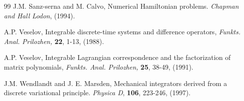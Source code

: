 \documentclass[a4paper,a4paper]{article}
\begin{document}
\begin{thebibliography} {99}
\label{s1}
J.M. Sanz-serna and M. Calvo, Numerical Hamiltonian problems. {\em
Chapman and Hall Lodon}, (1994).

\label{v1}
A.P. Veselov, Integrable discrete-time systems and difference operators, {\em
Funkts. Anal. Prilozhen,} {\bf 22}, 1-13, (1988).

\label{v2}
A.P. Veselov, Integrable Lagrangian correspondence and the factorization of
matrix polynomials,  {\em Funkts. Anal. Prilozhen,} {\bf 25}, 38-49, (1991).

\label{w1}
J.M. Wendlandt and J. E. Marsden, Mechanical integrators derived from a discrete
variational principle. {\em Physica D}, {\bf 106}, 223-246, (1997).

 
\end{thebibliography}

\end{document}
